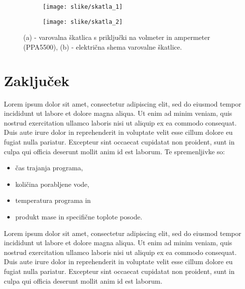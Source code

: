 \begin{figure}[h]

\begin{subfigure}{0.6\textwidth}
\texttt{[image: slike/skatla\_1]} 
\caption{}
\label{fig:subim1}
\end{subfigure}
\begin{subfigure}{0.4\textwidth}
\texttt{[image: slike/skatla\_2]}
\caption{}
\label{fig:subim2}
\end{subfigure}

\caption{(a) - varovalna škatlica s priključki na volmeter in ampermeter (PPA5500), (b) - električna shema varovalne škatlice.}
\label{fig:skatla}
\end{figure}

\pagebreak

\section{Zaključek}
Lorem ipsum dolor sit amet, consectetur adipiscing elit, sed do eiusmod tempor incididunt ut labore et dolore magna aliqua. Ut enim ad minim veniam, quis nostrud exercitation ullamco laboris nisi ut aliquip ex ea commodo consequat. Duis aute irure dolor in reprehenderit in voluptate velit esse cillum dolore eu fugiat nulla pariatur. Excepteur sint occaecat cupidatat non proident, sunt in culpa qui officia deserunt mollit anim id est laborum. Te spremenljivke so:
\begin{itemize}
\item čas trajanja programa,
\item količina porabljene vode,
\item temperatura programa in
\item produkt mase in specifične toplote posode.
\end{itemize}
Lorem ipsum dolor sit amet, consectetur adipiscing elit, sed do eiusmod tempor incididunt ut labore et dolore magna aliqua. Ut enim ad minim veniam, quis nostrud exercitation ullamco laboris nisi ut aliquip ex ea commodo consequat. Duis aute irure dolor in reprehenderit in voluptate velit esse cillum dolore eu fugiat nulla pariatur. Excepteur sint occaecat cupidatat non proident, sunt in culpa qui officia deserunt mollit anim id est laborum.
